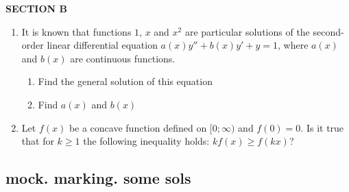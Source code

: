\textbf{SECTION B}

\begin{enumerate}[resume]

\item It is known that functions $1$, $x$ and $x^2$  are particular solutions of the second-order linear differential equation  $a(x)y''+b(x)y'+y=1$,  where $a(x)$  and $b(x)$  are continuous functions.
\begin{enumerate}
\item  Find the general solution of this equation
\item  Find $a(x)$ and  $b(x)$
\end{enumerate}
\item Let $f(x)$ be a concave function defined on $[0;\infty)$  and $f(0)=0$. Is it true that for $k \geq 1$ the following inequality holds: $kf(x)\geq f(kx)$?


\end{enumerate}


\subsection{mock. marking. some sols}

